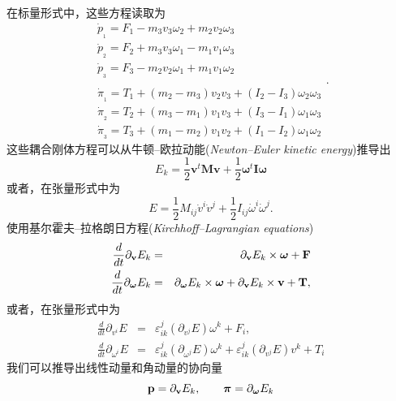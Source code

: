 \documentclass[11pt,fontset=founder]{ctexart}
\begin{document}
在标量形式中，这些方程读取为
\begin{equation*}
\begin{array}{c}
\dot{p}_{_1}={F_1}-{m_3}{v_3}{\omega _2}+{m_2}{v_2}{\omega _3} \\
\dot{p}_{_2}={F_2}+{m_3}{v_3}{\omega _1}-{m_1}{v_1}{\omega _3} \\
\dot{p}_{_3}={F_3}-{m_2}{v_2}{\omega _1}+{m_1}{v_1}{\omega _2} \\
\\
\dot{\pi}_{_1}={T_1}+({m_2}-{m_3}){v_2}{v_3}+({I_2}-{I_3}){\omega _2}{\omega
_3} \\
\dot{\pi}_{_2}={T_2}+({m_3}-{m_1}){v_1}{v_3}+({I_3}-{I_1}){\omega _1}{\omega
_3} \\
\dot{\pi}_{_3}={T_3}+({m_1}-{m_2}){v_1}{v_2}+({I_1}-{I_2}){\omega _1}{\omega
_2}%
\end{array}%
.
\end{equation*}
这些耦合刚体方程可以从牛顿–欧拉动能(\textit{Newton--Euler kinetic energy})推导出
\begin{equation*}
E_{k}={\frac{1}{2}}\mathbf{v}^{t}\mathbf{Mv}+{\frac{1}{2}}\mathbf{\omega }%
^{t}\mathbf{I\omega }
\end{equation*}
或者，在张量形式中为
\begin{equation*}
E={\frac{1}{2}}M_{ij}\dot{v}^{i}\dot{v}^{j}+{\frac{1}{2}}I_{ij}\dot{\omega}%
^{i}\dot{\omega}^{j}.
\end{equation*}
使用基尔霍夫–拉格朗日方程(\emph{Kirchhoff--Lagrangian equations})
\begin{eqnarray*}
\frac{d}{{dt}}\partial _{\mathbf{v}}E_{k} &=&\partial _{\mathbf{v}%
}E_{k}\times \mathbf{\omega }+\mathbf{F} \\
{\frac{d}{{dt}}}\partial _{\mathbf{\omega }}E_{k} &=&\partial _{\mathbf{%
\omega }}E_{k}\times \mathbf{\omega }+\partial _{\mathbf{v}}E_{k}\times
\mathbf{v}+\mathbf{T},
\end{eqnarray*}
或者，在张量形式中为
\begin{eqnarray*}
\frac{d}{dt}\partial _{v^{i}}E &=&\varepsilon _{ik}^{j}\left( \partial
_{v^{j}}E\right) \omega ^{k}+F_{i}, \\
\frac{d}{dt}\partial _{{\omega }^{i}}E &=&\varepsilon _{ik}^{j}\left(
\partial _{{\omega }^{j}}E\right) {\omega }^{k}+\varepsilon _{ik}^{j}\left(
\partial _{v^{j}}E\right) v^{k}+T_{i}
\end{eqnarray*}
我们可以推导出线性动量和角动量的协向量
\begin{equation*}
\mathbf{p}=\partial _{\mathbf{v}}E_{k}{,\qquad \mathbf{\pi }=\partial _{%
\mathbf{\omega }}E_{k}}
\end{equation*}
\end{document}

